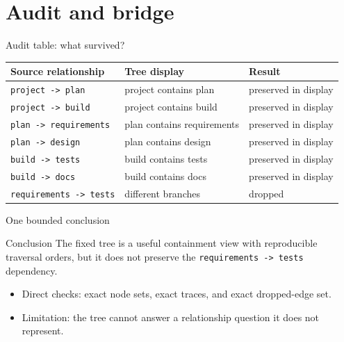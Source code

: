 \section{Audit and bridge}
\begin{frame}{Audit table: what survived?}
\small
\begin{tabular}{@{}p{4.2cm}p{4.2cm}p{4.2cm}@{}}
\textbf{Source relationship} & \textbf{Tree display} & \textbf{Result}\\\midrule
\texttt{project -> plan} & project contains plan & preserved in display\\
\texttt{project -> build} & project contains build & preserved in display\\
\texttt{plan -> requirements} & plan contains requirements & preserved in display\\
\texttt{plan -> design} & plan contains design & preserved in display\\
\texttt{build -> tests} & build contains tests & preserved in display\\
\texttt{build -> docs} & build contains docs & preserved in display\\
\texttt{requirements -> tests} & different branches & \textcolor{red!70!black}{dropped}\\
\end{tabular}
\vspace{8pt}
\end{frame}

\begin{frame}{One bounded conclusion}
\begin{block}{Conclusion}
The fixed tree is a useful containment view with reproducible traversal orders, but it does not preserve the \texttt{requirements -> tests} dependency.
\end{block}
\begin{itemize}
\item Direct checks: exact node sets, exact traces, and exact dropped-edge set.
\item Limitation: the tree cannot answer a relationship question it does not represent.
\end{itemize}
\end{frame}

